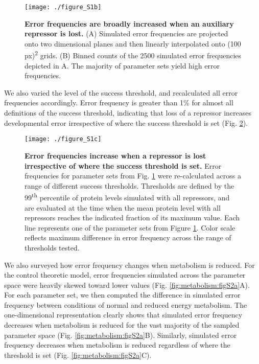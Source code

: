 \begin{figure}[h!]
\centering
\texttt{[image: ./figure\_S1b]}
\caption[Robustness of reduced metabolism simulations to parameter values.]{\textbf{Error frequencies are broadly increased when an auxiliary repressor is lost.} (A) Simulated error frequencies are projected onto two dimensional planes and then linearly interpolated onto (100 px)\textsuperscript{2} grids. (B) Binned counts of the 2500 simulated error frequencies depicted in A. The majority of parameter sets yield high error frequencies.}
\label{fig:metabolism:figS1b}
\end{figure}

We also varied the level of the success threshold, and recalculated all error frequencies accordingly. Error frequency is greater than 1\% for almost all definitions of the success threshold, indicating that loss of a repressor increases developmental error irrespective of where the success threshold is set (Fig. \ref{fig:metabolism:figS1c}).

\begin{figure}[h!]
\centering
\texttt{[image: ./figure\_S1c]}
\captionsetup{width=.65\linewidth}
\caption[Robustness of reduced metabolism simulations to threshold definition.]{\textbf{Error frequencies increase when a repressor is lost irrespective of where the success threshold is set.} Error frequencies for parameter sets from Fig. \ref{fig:metabolism:figS1b} were re-calculated across a range of different success thresholds. Thresholds are defined by the 99\textsuperscript{th} percentile of protein levels simulated with all repressors, and are evaluated at the time when the mean protein level with all repressors reaches the indicated fraction of its maximum value. Each line represents one of the parameter sets from Figure \ref{fig:metabolism:figS1b}. Color scale reflects maximum difference in error frequency across the range of thresholds tested.}
\label{fig:metabolism:figS1c}
\end{figure}

We also surveyed how error frequency changes when metabolism is reduced. For the control theoretic model, error frequencies simulated across the parameter space were heavily skewed toward lower values (Fig. \ref{fig:metabolism:figS2a}A). For each parameter set, we then computed the difference in simulated error frequency between conditions of normal and reduced energy metabolism. The one-dimensional representation clearly shows that simulated error frequency decreases when metabolism is reduced for the vast majority of the sampled parameter space (Fig. \ref{fig:metabolism:figS2a}B). Similarly, simulated error frequency decreases when metabolism is reduced regardless of where the threshold is set (Fig. \ref{fig:metabolism:figS2a}C). 

